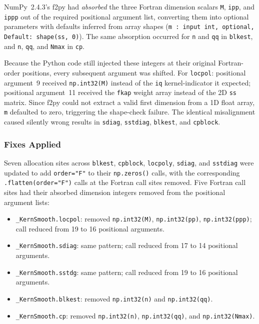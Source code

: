 \documentclass[12pt,a4paper]{article}
\begin{document}
NumPy~2.4.3's f2py had \emph{absorbed} the three Fortran dimension scalars \texttt{M}, \texttt{ipp}, and \texttt{ippp} out of the required positional argument list, converting them into optional parameters with defaults inferred from array shapes (\texttt{m~:~input int, optional, Default: shape(ss, 0)}). The same absorption occurred for \texttt{n} and \texttt{qq} in \texttt{blkest}, and \texttt{n}, \texttt{qq}, and \texttt{Nmax} in \texttt{cp}.

Because the Python code still injected these integers at their original Fortran-order positions, every subsequent argument was shifted. For \texttt{locpol}: positional argument~9 received \texttt{np.int32(M)} instead of the \texttt{iq} kernel-indicator it expected; positional argument~11 received the \texttt{fkap} weight array instead of the 2D \texttt{ss} matrix. Since f2py could not extract a valid first dimension from a 1D float array, \texttt{m} defaulted to zero, triggering the shape-check failure. The identical misalignment caused silently wrong results in \texttt{sdiag}, \texttt{sstdiag}, \texttt{blkest}, and \texttt{cpblock}.

\subsubsection{Fixes Applied}

Seven allocation sites across \texttt{blkest}, \texttt{cpblock}, \texttt{locpoly}, \texttt{sdiag}, and \texttt{sstdiag} were updated to add \texttt{order="F"} to their \texttt{np.zeros()} calls, with the corresponding \texttt{.flatten(order="F")} calls at the Fortran call sites removed. Five Fortran call sites had their absorbed dimension integers removed from the positional argument lists:

\begin{itemize}
  \item \texttt{\_KernSmooth.locpol}: removed \texttt{np.int32(M)}, \texttt{np.int32(pp)}, \texttt{np.int32(ppp)}; call reduced from 19 to 16 positional arguments.
  \item \texttt{\_KernSmooth.sdiag}: same pattern; call reduced from 17 to 14 positional arguments.
  \item \texttt{\_KernSmooth.sstdg}: same pattern; call reduced from 19 to 16 positional arguments.
  \item \texttt{\_KernSmooth.blkest}: removed \texttt{np.int32(n)} and \texttt{np.int32(qq)}.
  \item \texttt{\_KernSmooth.cp}: removed \texttt{np.int32(n)}, \texttt{np.int32(qq)}, and \texttt{np.int32(Nmax)}.
\end{itemize}
\end{document}
